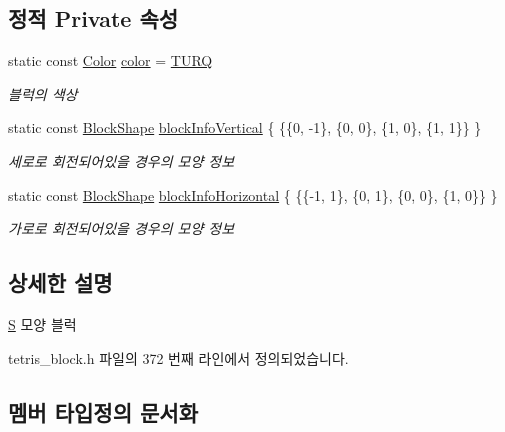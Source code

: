 \subsection*{정적 Private 속성}
\begin{DoxyCompactItemize}
\item 
static const \mbox{\hyperlink{class_block_ad054b4ac51df79aa910040b2a2fdf7b5}{Color}} \mbox{\hyperlink{class_s_a21faa1a841e2e11d5b9853bdfd0583df}{color}} = \mbox{\hyperlink{class_block_ad054b4ac51df79aa910040b2a2fdf7b5aa6acf45f9e85e879c50413b30769006a}{T\+U\+RQ}}
\begin{DoxyCompactList}\small\item\em 블럭의 색상 \end{DoxyCompactList}\item 
static const \mbox{\hyperlink{class_block_aca5d951639f113e2ebd7856209d6b9ab}{Block\+Shape}} \mbox{\hyperlink{class_s_a4dfa7559187c41616256612400bcaab7}{block\+Info\+Vertical}} \{ \{\{0, -\/1\}, \{0, 0\}, \{1, 0\}, \{1, 1\}\} \}
\begin{DoxyCompactList}\small\item\em 세로로 회전되어있을 경우의 모양 정보 \end{DoxyCompactList}\item 
static const \mbox{\hyperlink{class_block_aca5d951639f113e2ebd7856209d6b9ab}{Block\+Shape}} \mbox{\hyperlink{class_s_ac96253e642b4d209abc7ea47aa687999}{block\+Info\+Horizontal}} \{ \{\{-\/1, 1\}, \{0, 1\}, \{0, 0\}, \{1, 0\}\} \}
\begin{DoxyCompactList}\small\item\em 가로로 회전되어있을 경우의 모양 정보 \end{DoxyCompactList}\end{DoxyCompactItemize}


\subsection{상세한 설명}
\mbox{\hyperlink{class_s}{S}} 모양 블럭 

tetris\+\_\+block.\+h 파일의 372 번째 라인에서 정의되었습니다.



\subsection{멤버 타입정의 문서화}
\mbox{\label{class_block_aca5d951639f113e2ebd7856209d6b9ab}} 
